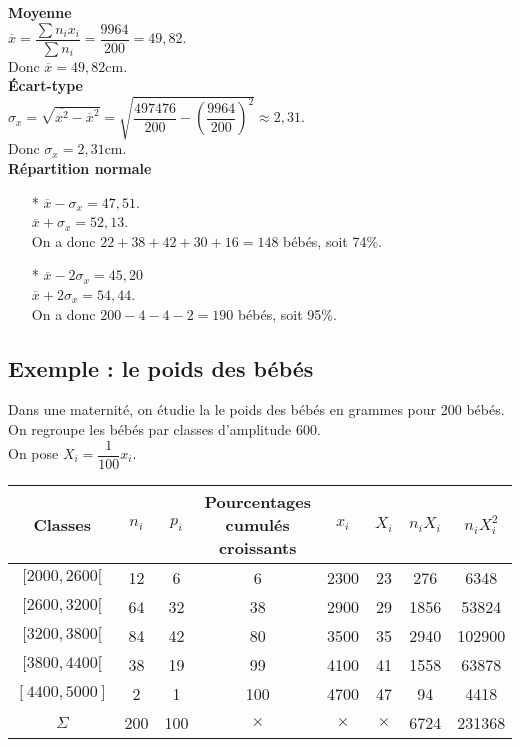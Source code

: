 \vspace*{.5cm}

\textbf{Moyenne} \\

$\overline{x} = \dfrac{\displaystyle{\sum n_ix_i}}{\displaystyle{\sum n_i}} = \dfrac{9964}{200} = 49,82$. \\

Donc $\overline{x} = 49,82$cm. \\

\textbf{Écart-type} \\

$\sigma_x = \sqrt{\overline{x^2} - \overline{x}^2} = \sqrt{\dfrac{497476}{200} - \left(\dfrac{9964}{200}\right)^2} \approx 2,31$. \\

Donc $\sigma_x = 2,31$cm. \\

\textbf{Répartition normale} \\

\begin{itemize}
\item[*] $\overline{x} - \sigma_x = 47,51$. \\ $\overline{x} + \sigma_x = 52,13$. \\On a donc $22 + 38 + 42 + 30 + 16 = 148$ bébés, soit 74\%. 
\\
\item[*] $\overline{x} - 2\sigma_x = 45,20$ \\ $\overline{x} + 2\sigma_x = 54,44$. \\ On a donc $200 - 4 - 4 - 2 = 190$ bébés, soit 95\%. 
\end{itemize}

\subsection{Exemple  : le poids des bébés}

Dans une maternité, on étudie la le poids des bébés en grammes pour 200 bébés. \\

On regroupe les bébés par classes d'amplitude 600. \\

On pose $X_i = \dfrac{1}{100}x_i$. \\

\begin{tabular}{c|c|c|c|c|c|c|c}
Classes & $n_i$ & $p_i$ & Pourcentages cumulés croissants & $x_i$ & $X_i$ & $n_iX_i$ & $n_iX_i^2$ \\
\hline
$[2000,2600[$ & 12 & 6 & 6 & 2300 & 23 & 276 & 6348 \\
$[2600,3200[$ & 64 & 32 & 38 & 2900 & 29 & 1856 & 53824 \\
$[3200,3800[$ & 84 & 42 & 80 & 3500 & 35 & 2940 & 102900 \\
$[3800,4400[$ & 38 & 19 & 99 & 4100 & 41 & 1558 & 63878 \\
$[4400,5000]$ & 2 & 1 & 100 & 4700 & 47 & 94 & 4418 \\
\hline
$\Sigma$ & 200 & 100 & {\Large {$\times$}} & {\Large {$\times$}} & {\Large {$\times$}} & 6724 & 231368 \\
\end{tabular}

